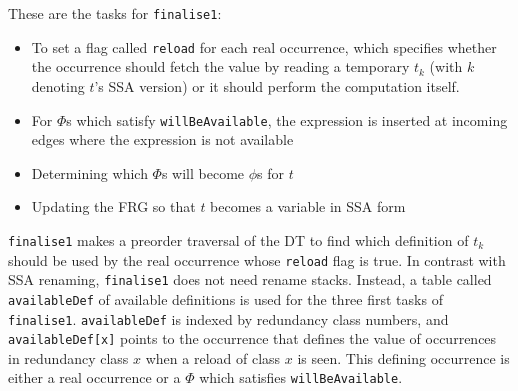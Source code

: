 \documentclass[a4paper,12pt, notitlepage]{article}
\begin{document}
These are the tasks for \texttt{finalise1}:
\begin{itemize}
\item To set a flag called \texttt{reload} for each real occurrence, which
specifies whether the occurrence should fetch the value by reading a temporary
$t_k$ (with $k$ denoting $t$'s SSA version) or it should perform the computation
itself.
\item For $\Phi$s which satisfy \texttt{willBeAvailable}, the expression is
inserted at incoming edges where the expression is not available
\item Determining which $\Phi$s will become $\phi$s for $t$
\item Updating the FRG so that $t$ becomes a variable in SSA form
\end{itemize}
\texttt{finalise1} makes a preorder traversal of the DT to find which definition
of $t_k$ should be used by the real occurrence whose \texttt{reload} flag is
true. In contrast with SSA renaming, \texttt{finalise1} does not need rename
stacks. Instead, a table called \texttt{availableDef} of available definitions
is used for the three first tasks of \texttt{finalise1}. \texttt{availableDef}
is indexed by redundancy class numbers, and \texttt{availableDef[x]} points to
the occurrence that defines the value of occurrences in redundancy class $x$
when a reload of class $x$ is seen. This defining occurrence is either a real
occurrence or a $\Phi$ which satisfies \texttt{willBeAvailable}.
\end{document}
